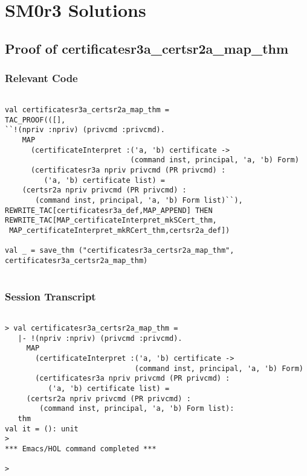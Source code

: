 \documentclass{report}
\begin{document}
\chapter{SM0r3 Solutions}
\label{sm0r3-solutions}

\section{Proof of certificatesr3a_certsr2a_map_thm}
\label{proof-4}

\subsection{Relevant Code}
\label{rel-code-4}
\begin{lstlisting}[frame=TBlr]

val certificatesr3a_certsr2a_map_thm =
TAC_PROOF(([],
``!(npriv :npriv) (privcmd :privcmd).
    MAP
      (certificateInterpret :('a, 'b) certificate ->
                             (command inst, principal, 'a, 'b) Form)
      (certificatesr3a npriv privcmd (PR privcmd) :
         ('a, 'b) certificate list) =
    (certsr2a npriv privcmd (PR privcmd) :
       (command inst, principal, 'a, 'b) Form list)``),
REWRITE_TAC[certificatesr3a_def,MAP_APPEND] THEN
REWRITE_TAC[MAP_certificateInterpret_mkSCert_thm,
 MAP_certificateInterpret_mkRCert_thm,certsr2a_def])

val _ = save_thm ("certificatesr3a_certsr2a_map_thm", certificatesr3a_certsr2a_map_thm)


\end{lstlisting}

\subsection{Session Transcript}
\label{trans4}
\begin{session}
  \begin{scriptsize}
\begin{verbatim}

> val certificatesr3a_certsr2a_map_thm =
   |- !(npriv :npriv) (privcmd :privcmd).
     MAP
       (certificateInterpret :('a, 'b) certificate ->
                              (command inst, principal, 'a, 'b) Form)
       (certificatesr3a npriv privcmd (PR privcmd) :
          ('a, 'b) certificate list) =
     (certsr2a npriv privcmd (PR privcmd) :
        (command inst, principal, 'a, 'b) Form list):
   thm
val it = (): unit
> 
*** Emacs/HOL command completed ***

> 

\end{verbatim}
  \end{scriptsize}
\end{session}
\end{document}

